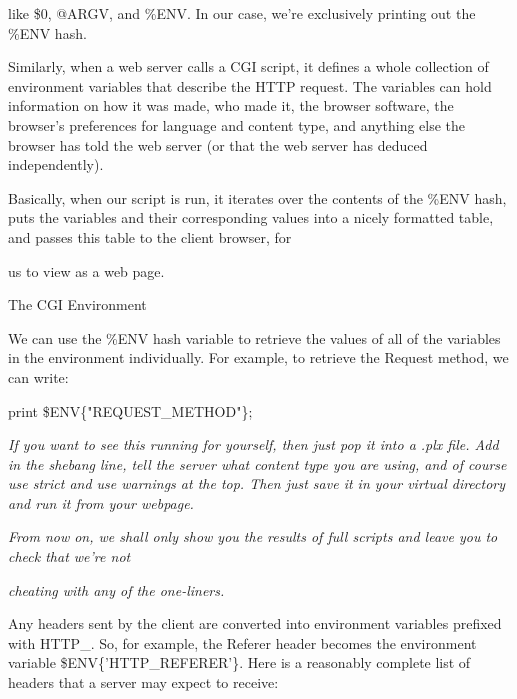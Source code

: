 \documentclass[a4paper,11pt]{book}
\begin{document}
\noindent like \$0,  @ARGV, and \%ENV. In our case, we're exclusively printing out the \%ENV hash.

\noindent 

\noindent Similarly, when a web server calls a CGI script, it defines a whole collection of environment variables that describe the HTTP request. The variables can hold information on how it was made, who made it, the browser software, the browser's preferences for language and content type, and anything else the browser has told the web server (or that the web server has deduced independently).

\noindent 

\noindent Basically, when our script is run, it iterates over the contents of the \%ENV hash, puts the variables and their corresponding values into a nicely formatted table, and passes this table to the client browser, for

\noindent us to view as a web page.

\noindent 

\noindent The CGI Environment

\noindent 

\noindent We can use the \%ENV hash variable to retrieve the values of all of the variables in the environment individually. For example, to retrieve the Request method, we can write:

\noindent 

\noindent print \$ENV\{"REQUEST\_METHOD"\};

\noindent 

\noindent \textit{If you want to see this running for yourself, then just pop it into a .plx file. Add in the shebang line, tell the server what content type you are using, and of course use strict and use warnings at the top. Then just save it in your virtual directory and run it from your webpage.}

\noindent \textit{From now on, we shall only show you the results of full scripts and leave you to check that we're not}

\noindent \textit{cheating with any of the one-liners.}

\noindent 

\noindent Any headers sent by the client are converted into environment variables prefixed with HTTP\_. So, for example, the Referer header becomes the environment variable \$ENV\{'HTTP\_REFERER'\}. Here is a reasonably complete list of headers that a server may expect to receive:

\noindent 
\end{document}
